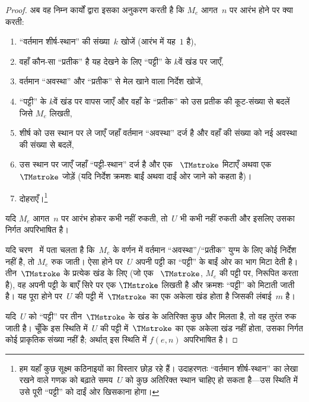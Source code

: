 \documentclass[../../../include/open-logic-section]{subfiles}
\begin{document}
\begin{proof}
  अब वह निम्न कार्यों द्वारा इसका अनुकरण करती है कि $M_e$ आगत~$n$ पर
  आरंभ होने पर क्या करती:
  \begin{enumerate}
    \item ``वर्तमान शीर्ष-स्थान'' की संख्या~$k$ खोजें (आरंभ में यह~$1$
    है),
    \item वहाँ कौन-सा ``प्रतीक'' है यह देखने के लिए ``पट्टी'' के $k$वें
    खंड पर जाएँ,
    \item{}%
    वर्तमान ``अवस्था'' और ``प्रतीक'' से मेल खाने वाला निर्देश खोजें,
    \item ``पट्टी'' के $k$वें खंड पर वापस जाएँ और वहाँ के ``प्रतीक'' को
    उस प्रतीक की कूट-संख्या से बदलें जिसे $M_e$ लिखती,
    \item शीर्ष को उस स्थान पर ले जाएँ जहाँ वर्तमान ``अवस्था'' दर्ज है
    और वहाँ की संख्या को नई अवस्था की संख्या से बदलें,
    \item उस स्थान पर जाएँ जहाँ ``पट्टी-स्थान'' दर्ज है और एक
    ~$\TMstroke$ मिटाएँ अथवा एक~$\TMstroke$ जोड़ें (यदि निर्देश क्रमशः
    बाईं अथवा दाईं ओर जाने को कहता है)।
    \item दोहराएँ।\footnote{हम यहाँ कुछ सूक्ष्म कठिनाइयों का विस्तार
    छोड़ रहे हैं। उदाहरणतः ``वर्तमान शीर्ष-स्थान'' का लेखा रखने वाले
    गणक को बढ़ाते समय~$U$ को कुछ अतिरिक्त स्थान चाहिए हो सकता है---उस
    स्थिति में उसे पूरी ``पट्टी'' को दाईं ओर खिसकाना होगा।}
  \end{enumerate}
  यदि $M_e$ आगत~$n$ पर आरंभ होकर कभी नहीं रुकती, तो~$U$ भी कभी नहीं
  रुकती और इसलिए उसका निर्गत अपरिभाषित है।

  यदि चरण~ में पता चलता है कि~$M_e$ के वर्णन में
  वर्तमान ``अवस्था''/``प्रतीक'' युग्म के लिए कोई निर्देश नहीं है, तो
  $M_e$ रुक जाती। ऐसा होने पर~$U$ अपनी पट्टी का ``पट्टी'' के बाईं ओर का
  भाग मिटा देती है। तीन~$\TMstroke$ के प्रत्येक खंड के लिए (जो एक
  ~$\TMstroke$, $M_e$ की पट्टी पर, निरूपित करता है), वह अपनी पट्टी के बाएँ सिरे
  पर एक $\TMstroke$ लिखती है और क्रमशः ``पट्टी'' को मिटाती जाती है। यह
  पूरा होने पर~$U$ की पट्टी में~$\TMstroke$ का एक अकेला खंड होता है
  जिसकी लंबाई~$m$ है।
  
  यदि~$U$ को ``पट्टी'' पर तीन~$\TMstroke$ के खंड के अतिरिक्त कुछ और
  मिलता है, तो वह तुरंत रुक जाती है। चूँकि इस स्थिति में~$U$ की पट्टी
  में~$\TMstroke$ का एक अकेला खंड नहीं होता, उसका निर्गत कोई प्राकृतिक
  संख्या नहीं है; अर्थात् इस स्थिति में $f(e,n)$ अपरिभाषित है।
\end{proof}
\end{document}
